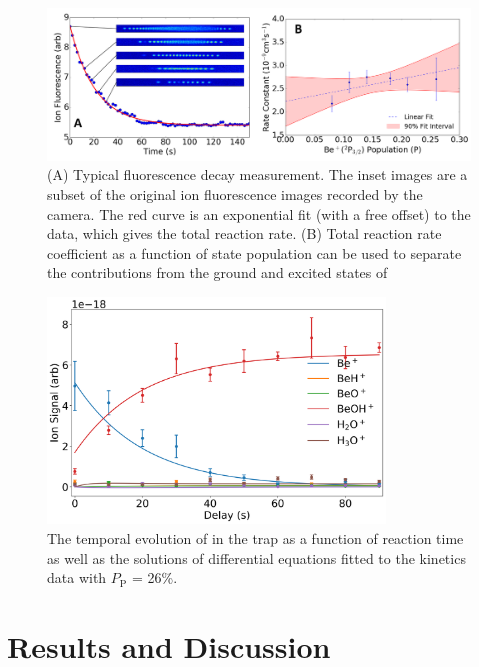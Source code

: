 \begin{figure}
	\centering
	\includegraphics[width=\textwidth]{images/Be_H2O_fit.png}
	\caption{(A) Typical fluorescence decay measurement. The inset images are a subset of the original ion fluorescence images recorded by the camera. The red curve is an exponential fit (with a free offset) to the data, which gives the total reaction rate. (B) Total reaction rate coefficient as a function of  state population can be used to separate the contributions from the ground and excited states of }
	\label{fig: Be+H2O fit}
\end{figure}

\begin{figure}
	\centering
	\includegraphics[width=0.8\textwidth]{images/Be_H2O_sf_2.png}
	\caption{The temporal evolution of 	in the trap as a function of reaction time as well as the solutions of differential equations fitted to the kinetics data with $P_{\text{P}}$ = 26\%.}
	\label{fig: Be+H2O shared fit}
\end{figure}


\section{Results and Discussion}

